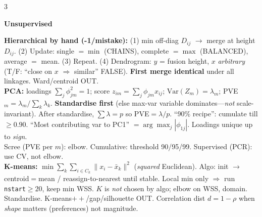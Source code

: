 \documentclass[a4paper,9pt]{extarticle}
\newcommand{\Var}{\mathrm{Var}}
\newcommand{\hd}[1]{\textbf{#1}}
\newcommand{\sect}[1]{\par\vspace{1pt}\noindent\colorbox{black!10}{\parbox{\dimexpr\linewidth-2\fboxsep\relax}{\strut\textbf{#1}\strut}}\par\vspace{1pt}}
\begin{document}
\begin{multicols*}{3}
\sect{Unsupervised}
\hd{Hierarchical by hand (-1/mistake):} (1) min off-diag $D_{ij}$ $\to$ merge at height $D_{ij}$. (2) Update: single $=\min$ (CHAINS), complete $=\max$ (BALANCED), average $=$ mean. (3) Repeat. (4) Dendrogram: $y$ = fusion height, $x$ \emph{arbitrary} (T/F: ``close on $x$ $\Rightarrow$ similar'' FALSE). \hd{First merge identical} under all linkages. Ward/centroid OUT.\\
\hd{PCA:} loadings $\sum_j\phi_{jm}^2=1$; score $z_{im}=\sum_j\phi_{jm}x_{ij}$; $\Var(Z_m)=\lambda_m$; PVE$_m=\lambda_m/\sum_k\lambda_k$. \hd{Standardise first} (else max-var variable dominates---\emph{not} scale-invariant). After standardise, $\sum\lambda=p$ so PVE$=\lambda/p$. ``90\% recipe'': cumulate till $\ge 0.90$. ``Most contributing var to PC1'' $=\arg\max_j|\phi_{1j}|$. Loadings unique up to \emph{sign}.\\
Scree (PVE per $m$): elbow. Cumulative: threshold 90/95/99. Supervised (PCR): use CV, not elbow.\\
\hd{K-means:} $\min\sum_k\sum_{i\in C_k}\|x_i-\bar x_k\|^2$ (\emph{squared} Euclidean). Algo: init $\to$ centroid$=$mean / reassign-to-nearest until stable. Local min only $\Rightarrow$ run \texttt{nstart}$\ge 20$, keep min WSS. $K$ is \emph{not} chosen by algo; elbow on WSS, domain. Standardise. K-means$++$/gap/silhouette OUT. Correlation dist $d=1-\rho$ when \emph{shape} matters (preferences) not magnitude.


\end{multicols*}
\end{document}
